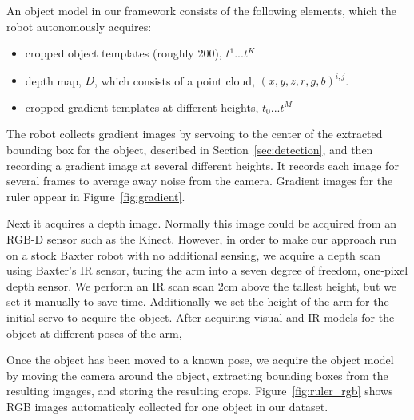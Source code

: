 \documentclass[graybox]{svmult}
\begin{document}
An object model in our framework consists of the following elements,
which the robot autonomously acquires:
\begin{itemize}
\item cropped object templates (roughly 200), $t^1 ... t^K$
\item depth map, $D$, which consists of a point cloud, $(x, y, z, r, g, b)^{i,j}$.
\item cropped gradient templates at different heights, $t_0 ...  t^M$
\end{itemize}

The robot collects gradient images by servoing to the center of the
extracted bounding box for the object, described in
Section~\ref{sec:detection}, and then recording a gradient image at
several different heights.  It records each image for several frames
to average away noise from the camera.  Gradient images for the ruler
appear in Figure~\ref{fig:gradient}.  

Next it acquires a depth image.  Normally this image could be acquired
from an RGB-D sensor such as the Kinect.  However, in order to make
our approach run on a stock Baxter robot with no additional sensing,
we acquire a depth scan using Baxter's IR sensor, turing the arm into
a seven degree of freedom, one-pixel depth sensor.  We perform an IR
scan scan 2cm above the tallest height, but we set it manually to save
time.  Additionally we set the height of the arm for the initial servo
to acquire the object.  After acquiring visual and IR models for the
object at different poses of the arm,

Once the object has been moved to
a known pose, we acquire the object model by moving the camera around
the object, extracting bounding boxes from the resulting imgages, and
storing the resulting crops.  Figure~\ref{fig:ruler_rgb} shows RGB
images automaticaly collected for one object in our dataset.
\end{document}
